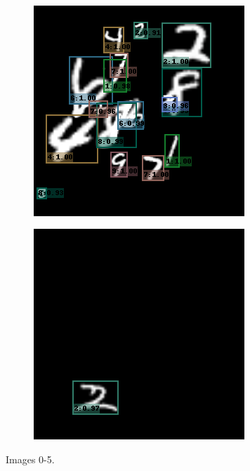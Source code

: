 \begin{figure}
\begin{subfigure}[b]{0.49\textwidth}
  \end{subfigure}
  ~
  \begin{subfigure}[b]{0.49\textwidth}
    \centering
    \includegraphics[width=\textwidth]{figures/4.png}
  \end{subfigure}
  \begin{subfigure}[b]{0.49\textwidth}
    \centering
    \includegraphics[width=\textwidth]{figures/5.png}
  \end{subfigure}
  \caption{Images 0-5.}
  \label{fig:task4:e1}
\end{figure}

